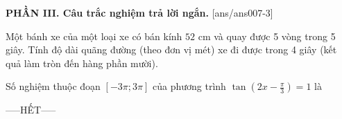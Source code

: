 \documentclass[12pt,a4paper]{article}
\begin{document}
{\bf PHẦN III. Câu trắc nghiệm trả lời ngắn.}
\setcounter{ex}{0}
[ans/ans007-3]
\begin{ex}
 Một bánh xe của một loại xe có bán kính ${52}$ cm và quay được 5 vòng trong 5 giây. Tính độ dài quãng đường (theo đơn vị mét) xe đi được trong 4 giây (kết quả làm tròn đến hàng phần mười). 

\end{ex}

\begin{ex}
 Số nghiệm thuộc đoạn $[- 3 \pi;3 \pi]$ của phương trình $\tan \left(2 x - \frac{\pi}{3}\right)=1$ là

\end{ex}


 \begin{center}
-----HẾT-----
\end{center}

\newpage 
\end{document}
